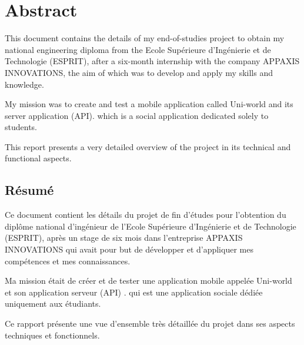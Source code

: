 \chapter*{Abstract}

This document contains the details of my end-of-studies project to obtain my national engineering diploma from the Ecole Supérieure d'Ingénierie et de Technologie (ESPRIT), after a six-month internship with the company APPAXIS INNOVATIONS, the aim of which was to develop and apply my skills and knowledge.

My mission was to create and test a mobile application called Uni-world and its server application (API). which is a social application dedicated solely to students.

This report presents a very detailed overview of the project in its technical and functional aspects.
\section*{Résumé}
 Ce document contient les détails du projet de fin d'études pour l'obtention du diplôme national d'ingénieur de l'Ecole Supérieure d'Ingénierie et de Technologie (ESPRIT), après un stage de six mois dans l'entreprise APPAXIS INNOVATIONS qui avait pour but de développer et d'appliquer mes compétences et mes connaissances.

Ma mission était de créer et de tester une application mobile appelée Uni-world et son application serveur (API) . qui est une application sociale dédiée uniquement aux étudiants.

Ce rapport présente une vue d'ensemble très détaillée du projet dans ses aspects techniques et fonctionnels.
